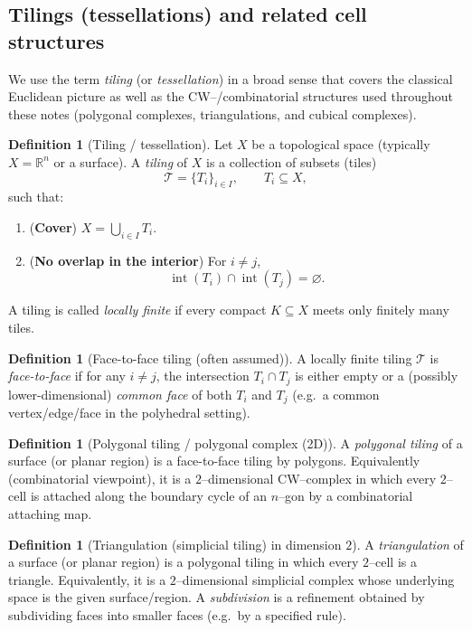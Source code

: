 \documentclass[11pt]{article}
\theoremstyle{definition}
\newtheorem{definition}[theorem]{Definition}
\theoremstyle{plain}
\theoremstyle{remark}
\begin{document}
\subsection{Tilings (tessellations) and related cell structures}
We use the term \emph{tiling} (or \emph{tessellation}) in a broad sense that covers the classical Euclidean picture
as well as the CW--/combinatorial structures used throughout these notes (polygonal complexes, triangulations,
and cubical complexes).

\begin{definition}[Tiling / tessellation]
Let $X$ be a topological space (typically $X=\mathbb{R}^n$ or a surface).
A \emph{tiling} of $X$ is a collection of subsets (tiles)
\[
\mathcal{T}=\{T_i\}_{i\in I}, \qquad T_i\subseteq X,
\]
such that:
\begin{enumerate}
\item (\textbf{Cover}) $X=\bigcup_{i\in I} T_i$.
\item (\textbf{No overlap in the interior}) For $i\neq j$,
\[
\operatorname{int}(T_i)\cap \operatorname{int}(T_j)=\varnothing.
\]
\end{enumerate}
A tiling is called \emph{locally finite} if every compact $K\subseteq X$ meets only finitely many tiles.
\end{definition}

\begin{definition}[Face-to-face tiling (often assumed)]
A locally finite tiling $\mathcal{T}$ is \emph{face-to-face} if for any $i\neq j$,
the intersection $T_i\cap T_j$ is either empty or a (possibly lower-dimensional) \emph{common face}
of both $T_i$ and $T_j$ (e.g.\ a common vertex/edge/face in the polyhedral setting).
\end{definition}

\begin{definition}[Polygonal tiling / polygonal complex (2D)]
A \emph{polygonal tiling} of a surface (or planar region) is a face-to-face tiling by polygons.
Equivalently (combinatorial viewpoint), it is a $2$--dimensional CW--complex in which every $2$--cell
is attached along the boundary cycle of an $n$--gon by a combinatorial attaching map.
\end{definition}

\begin{definition}[Triangulation (simplicial tiling) in dimension $2$]
A \emph{triangulation} of a surface (or planar region) is a polygonal tiling in which every $2$--cell is a triangle.
Equivalently, it is a $2$--dimensional simplicial complex whose underlying space is the given surface/region.
A \emph{subdivision} is a refinement obtained by subdividing faces into smaller faces (e.g.\ by a specified rule).
\end{definition}
\end{document}
